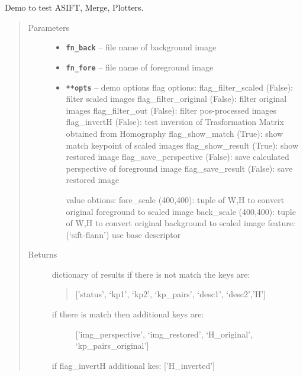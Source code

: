 \documentclass[letterpaper,10pt,english]{sphinxmanual}
\begin{document}
\begin{fulllineitems}
\label{RRtoolbox.tools:RRtoolbox.tools.restoration.asif_demo}
Demo to test ASIFT, Merge, Plotters.
\begin{quote}\begin{description}
\item[{Parameters}] \leavevmode\begin{itemize}
\item {} 
\textbf{\texttt{fn\_back}} -- file name of background image

\item {} 
\textbf{\texttt{fn\_fore}} -- file name of foreground image

\item {} 
\textbf{\texttt{**opts}} -- 
demo options
flag options:
flag\_filter\_scaled (False): filter scaled images
flag\_filter\_original (False): filter original images
flag\_filter\_out (False): filter pos-processed images
flag\_invertH (False): test inversion of Trasformation Matrix obtained from Homography
flag\_show\_match (True): show match keypoint of scaled images
flag\_show\_result (True): show restored image
flag\_save\_perspective (False): save calculated perspective of foreground image
flag\_save\_result (False): save restored image

value obtions:
fore\_scale (400,400): tuple of W,H to convert original foreground to scaled image
back\_scale (400,400): tuple of W,H to convert original background to scaled image
feature: (`sift-flann') use base descriptor


\end{itemize}

\item[{Returns}] \leavevmode

dictionary of results
if there is not match the keys are:
\begin{quote}

{[}'status', `kp1', `kp2', `kp\_pairs', `desc1', `desc2','H'{]}
\end{quote}
\begin{description}
\item[{if there is match then additional keys are:}] \leavevmode
{[}'img\_perspective', `img\_restored', `H\_original', `kp\_pairs\_original'{]}

\end{description}

if flag\_invertH additional kes: {[}'H\_inverted'{]}


\end{description}\end{quote}

\end{fulllineitems}
\end{document}
